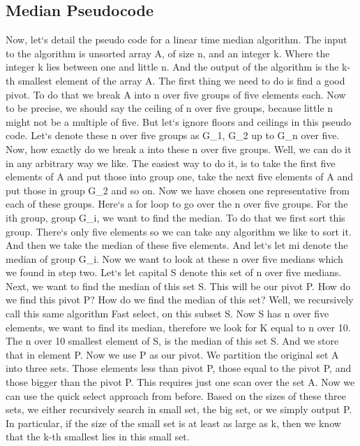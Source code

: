 \subsection{Median  Pseudocode}
Now, let`s detail the pseudo code for a linear time median algorithm.
The input to the algorithm is unsorted array A, of size n, and an integer k.
Where the integer k lies between one and little n.
And the output of the algorithm is the k-th smallest element of the array A\@.
The first thing we need to do is find a good pivot.
To do that we break A into n over five groups of five elements each.
Now to be precise, we should say the ceiling of n over five groups, because little n might not be a multiple of five.
But let`s ignore floors and ceilings in this pseudo code.
Let`s denote these n over five groups as G\_1, G\_2 up to G\_n over five.
Now, how exactly do we break a into these n over five groups.
Well, we can do it in any arbitrary way we like.
The easiest way to do it, is to take the first five elements of A and put those into group one, take the next five elements of A and put those in group G\_2 and so on.
Now we have chosen one representative from each of these groups.
Here`s a for loop to go over the n over five groups.
For the ith group, group G\_i, we want to find the median.
To do that we first sort this group.
There`s only five elements so we can take any algorithm we like to sort it.
And then we take the median of these five elements.
And let`s let mi denote the median of group G\_i.
Now we want to look at these n over five medians which we found in step two.
Let`s let capital S denote this set of n over five medians.
Next, we want to find the median of this set S\@.
This will be our pivot P\@.
How do we find this pivot P? How do we find the median of this set? Well, we recursively call this same algorithm Fast select, on this subset S\@.
Now S has n over five elements, we want to find its median, therefore we look for K equal to n over 10.
The n over 10 smallest element of S, is the median of this set S\@.
And we store that in element P\@.
Now we use P as our pivot.
We partition the original set A into three sets.
Those elements less than pivot P, those equal to the pivot P, and those bigger than the pivot P\@.
This requires just one scan over the set A\@.
Now we can use the quick select approach from before.
Based on the sizes of these three sets, we either recursively search in small set, the big set, or we simply output P\@.
In particular, if the size of the small set is at least as large as k, then we know that the k-th smallest lies in this small set.

